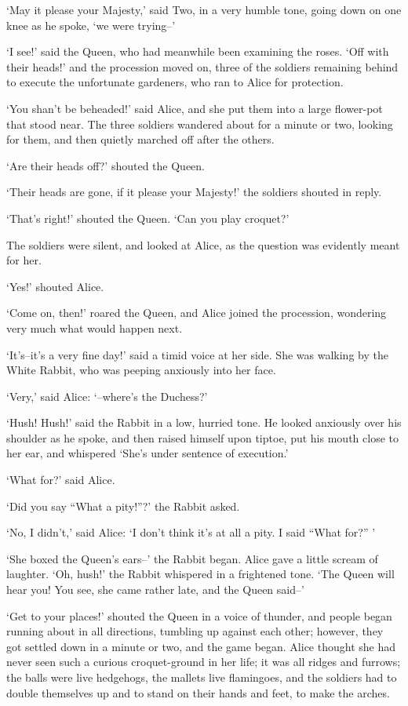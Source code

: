   `May it please your Majesty,' said Two, in a very humble tone,
going down on one knee as he spoke, `we were trying--'

  `I see!' said the Queen, who had meanwhile been examining the
roses.  `Off with their heads!' and the procession moved on,
three of the soldiers remaining behind to execute the unfortunate
gardeners, who ran to Alice for protection.

  `You shan't be beheaded!' said Alice, and she put them into a
large flower-pot that stood near.  The three soldiers wandered
about for a minute or two, looking for them, and then quietly
marched off after the others.

  `Are their heads off?' shouted the Queen.

  `Their heads are gone, if it please your Majesty!' the soldiers
shouted in reply.

  `That's right!' shouted the Queen.  `Can you play croquet?'

  The soldiers were silent, and looked at Alice, as the question
was evidently meant for her.

  `Yes!' shouted Alice.

  `Come on, then!' roared the Queen, and Alice joined the
procession, wondering very much what would happen next.

  `It's--it's a very fine day!' said a timid voice at her side.
She was walking by the White Rabbit, who was peeping anxiously
into her face.

  `Very,' said Alice:  `--where's the Duchess?'

  `Hush!  Hush!' said the Rabbit in a low, hurried tone.  He
looked anxiously over his shoulder as he spoke, and then raised
himself upon tiptoe, put his mouth close to her ear, and
whispered `She's under sentence of execution.'

  `What for?' said Alice.

  `Did you say ``What a pity!''?' the Rabbit asked.

  `No, I didn't,' said Alice:  `I don't think it's at all a pity.
I said ``What for?'' '

  `She boxed the Queen's ears--' the Rabbit began.  Alice gave a
little scream of laughter.  `Oh, hush!' the Rabbit whispered in a
frightened tone.  `The Queen will hear you!  You see, she came
rather late, and the Queen said--'

  `Get to your places!' shouted the Queen in a voice of thunder,
and people began running about in all directions, tumbling up
against each other; however, they got settled down in a minute or
two, and the game began.  Alice thought she had never seen such a
curious croquet-ground in her life; it was all ridges and
furrows; the balls were live hedgehogs, the mallets live
flamingoes, and the soldiers had to double themselves up and to
stand on their hands and feet, to make the arches.


